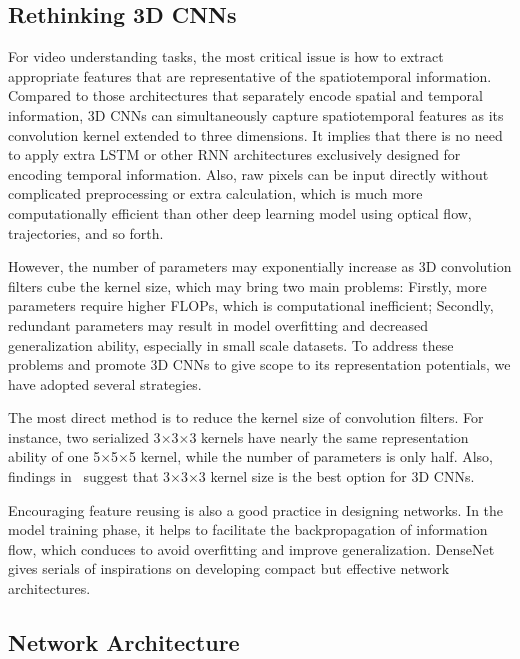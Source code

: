 \documentclass[10pt,twocolumn,letterpaper]{article}
\begin{document}
\subsection{Rethinking 3D CNNs}

For video understanding tasks, the most critical issue is how to extract appropriate features that are representative of the spatiotemporal information.
Compared to those architectures that separately encode spatial and temporal information, 3D CNNs can simultaneously capture spatiotemporal features as its convolution kernel extended to three dimensions. 
It implies that there is no need to apply extra LSTM or other RNN architectures exclusively designed for encoding temporal information. 
Also, raw pixels can be input directly without complicated preprocessing or extra calculation, which is much more computationally efficient than other deep learning model using optical flow, trajectories, and so forth.

However, the number of parameters may exponentially increase as 3D convolution filters cube the kernel size, which may bring two main problems: 
Firstly, more parameters require higher FLOPs, which is computational inefficient; 
Secondly, redundant parameters may result in model overfitting and decreased generalization ability, especially in small scale datasets. 
To address these problems and promote 3D CNNs to give scope to its representation potentials, we have adopted several strategies.

The most direct method is to reduce the kernel size of convolution filters. 
For instance, two serialized 3$\times$3$\times$3 kernels have nearly the same representation ability of one 5$\times$5$\times$5 kernel, while the number of parameters is only half. 
Also, findings in~\cite{3dcnn_1, 3dcnn_2, r2+1d} suggest that 3$\times$3$\times$3 kernel size is the best option for 3D CNNs.

Encouraging feature reusing is also a good practice in designing networks. 
In the model training phase, it helps to facilitate the backpropagation of information flow, which conduces to avoid overfitting and improve generalization. 
DenseNet~\cite{densenet} gives serials of inspirations on developing compact but effective network architectures.

\subsection{Network Architecture}
\end{document}
